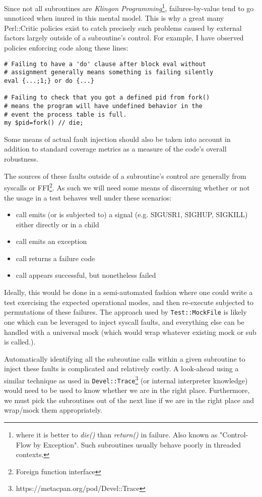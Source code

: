 \documentclass{article}
\begin{document}
Since not all subroutines are \textit{Klingon Programming}\footnote{where it is better to \textit{die()} than \textit{return()} in failure.  Also known as "Control-Flow by Exception".  Such subroutines usually behave poorly in threaded contexts.},
failures-by-value tend to go unnoticed when inured in this mental model.
This is why a great many Perl::Critic policies exist to catch precisely such problems caused by external factors largely outside of a subroutine's control.
For example, I have observed policies enforcing code along these lines:
\begin{lstlisting}
# Failing to have a 'do' clause after block eval without
# assignment generally means something is failing silently
eval {...;1;} or do {...}

# Failing to check that you got a defined pid from fork()
# means the program will have undefined behavior in the
# event the process table is full.
my $pid=fork() // die;
\end{lstlisting}
Some means of actual fault injection should also be taken into account in addition to standard coverage metrics as a measure of the code's overall robustness.

The sources of these faults outside of a subroutine's control are generally from syscalls or FFI\footnote{Foreign function interface}.
As such we will need some means of discerning whether or not the usage in a test behaves well under these scenarios:
\begin{itemize}
\item call emits (or is subjected to) a signal (e.g. SIGUSR1, SIGHUP, SIGKILL) either directly or in a child
\item call emits an exception
\item call returns a failure code
\item call appears successful, but nonetheless failed
\end{itemize}
Ideally, this would be done in a semi-automated fashion where one could write a test exercising the expected operational modes, and then re-execute subjected to permutations of these failures.
The approach used by \texttt{Test::MockFile}\cite{mock} is likely one which can be leveraged to inject syscall faults, and everything else can be handled with a universal mock (which would wrap whatever existing mock or sub is called.).

Automatically identifying all the subroutine calls within a given subroutine to inject these faults is complicated and relatively costly.
A look-ahead using a similar technique as used in \texttt{Devel::Trace}\footnote{https://metacpan.org/pod/Devel::Trace} (or internal interpreter knowledge) would need to be used to know whether we are in the right place.
Furthermore, we must pick the subroutines out of the next line if we are in the right place and wrap/mock them appropriately.
\end{document}
